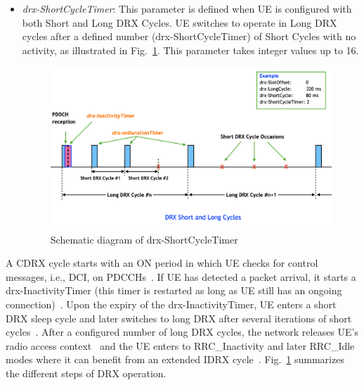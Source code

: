 \documentclass[]{IEEEtran}
\begin{document}
\begin{itemize}
    \item \textit{drx-ShortCycleTimer}: This parameter is defined when UE is configured with both Short and Long DRX Cycles. UE switches to operate in Long DRX cycles after a defined number (drx-ShortCycleTimer) of Short Cycles with no activity, as illustrated in Fig.~\ref{fig:5g-drx-ShortCycleTimer}. This parameter takes integer values up to 16.
\begin{figure}
    \centering
    \includegraphics[width=\linewidth]{Pictures/Schematic diagram of drx-ShortCycleTimer.png}
    \caption{Schematic diagram of drx-ShortCycleTimer}
    \label{fig:5g-drx-ShortCycleTimer}
\end{figure}

\end{itemize}

A CDRX cycle starts with an ON period in which UE checks for control messages, i.e., DCI, on PDCCHs~\cite{tung2015analysis}. 
If UE has detected a packet arrival, it starts a drx-InactivityTimer (this timer is restarted as long as UE still has an ongoing connection)~\cite{bontu2009drx}. 
Upon the expiry of the drx-InactivityTimer, UE enters a short DRX sleep cycle and later switches to long DRX after several iterations of short cycles~\cite{tseng2015delay}. 
After a configured number of long DRX cycles, the network releases UE's radio access context~\cite{agiwal2022enhanced} and the UE enters to RRC\_Inactivity and later RRC\_Idle modes where it can benefit from an extended IDRX cycle~\cite{kumar2021analytical}. Fig.~\ref{fig:5g-drx-ShortCycleTimer} summarizes the different steps of DRX operation.
\end{document}
